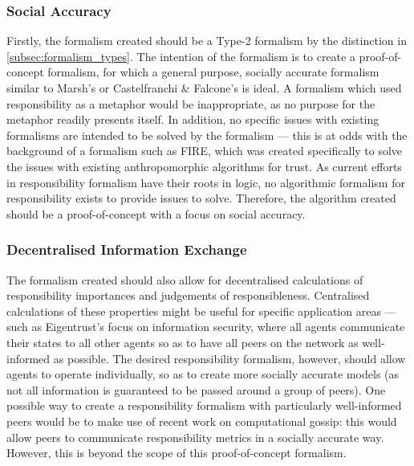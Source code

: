 \subsubsection{Social Accuracy}
Firstly, the formalism created should be a Type-2 formalism by the distinction in \cref{subsec:formalism_types}. The intention of the formalism is to create a proof-of-concept formalism, for which a general purpose, socially accurate formalism similar to Marsh's or Castelfranchi \& Falcone's is ideal. A formalism which used responsibility as a metaphor would be inappropriate, as no purpose for the metaphor readily presents itself. In addition, no specific issues with existing formalisms are intended to be solved by the formalism --- this is at odds with the background of a formalism such as FIRE, which was created specifically to solve the issues with existing anthropomorphic algorithms for trust. As current efforts in responsibility formalism have their roots in logic, no algorithmic formalism for responsibility exists to provide issues to solve. Therefore, the algorithm created should be a proof-of-concept with a focus on social accuracy.\par

\subsubsection{Decentralised Information Exchange}
The formalism created should also allow for decentralised calculations of responsibility importances and judgements of responsibleness. Centralised calculations of these properties might be useful for specific application areas --- such as Eigentrust's focus on information security, where all agents communicate their states to all other agents so as to have all peers on the network as well-informed as possible. The desired responsibility formalism, however, should allow agents to operate individually, so as to create more socially accurate models (as not all information is guaranteed to be passed around a group of peers). One possible way to create a responsibility formalism with particularly well-informed peers would be to make use of recent work on computational gossip\cite{Boyd2006,Lavaei2012}: this would allow peers to communicate responsibility metrics in a socially accurate way. However, this is beyond the scope of this proof-of-concept formalism.\par

